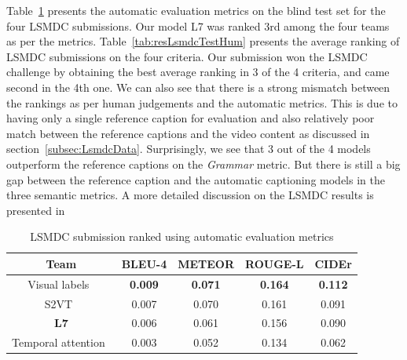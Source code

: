 Table~\ref{tab:resLsmdcTestMet} presents the automatic evaluation metrics on the
blind test set for the four LSMDC submissions.
Our model L7 was ranked 3rd among the four teams as per the metrics.
Table~\ref{tab:resLsmdcTestHum} presents the average ranking of LSMDC
submissions on the four criteria.
Our submission won the LSMDC challenge by obtaining the best average ranking in
3 of the 4 criteria, and came second in the 4th one.
We can also see that there is a strong mismatch between the rankings as per
human judgements and the automatic metrics.
This is due to having only a single reference caption for evaluation and also
relatively poor match between the reference captions and the video content as
discussed in section~\ref{subsec:LsmdcData}.
Surprisingly, we see that 3 out of the 4 models outperform the reference
captions on the \emph{Grammar} metric.
But there is still a big gap between the reference caption and the automatic
captioning models in the three semantic metrics.
A more detailed discussion on the LSMDC results is presented
in~\cite{DBLP:journals/corr/RohrbachTRTPLCS16}

\begin{table}[th]
  \centering
  \newcommand{\bs}{\small\bf}
  \begin{adjustbox}{center}
  \begin{tabular}{||c|c|c|c|c|}
    \hline\hline
    \bf Team  &\bs BLEU-4 &\bs METEOR &\bs ROUGE-L &\bs CIDEr \\\hline\hline
    Visual labels~\cite{rohrbach2015long} &\bf0.009&\bf0.071&\bf0.164&\bf0.112\\
    S2VT~\cite{venugopalan2015sequence} & 0.007 & 0.070 & 0.161 & 0.091\\
    \bf L7               & 0.006 & 0.061 & 0.156 & 0.090\\
    Temporal attention~\cite{yao2015describing} & 0.003 & 0.052 & 0.134 & 0.062\\\hline
    \hline
  \end{tabular}
  \end{adjustbox}
  \caption{LSMDC submission ranked using automatic evaluation metrics}
  \label{tab:resLsmdcTestMet}
\end{table}

